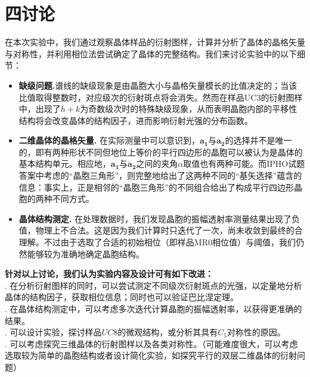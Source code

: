 \documentclass{ctexart}
\begin{document}
\section*{四\quad 讨论}

在本次实验中，我们通过观察晶体样品的衍射图样，计算并分析了晶体的晶格矢量与对称性，并利用相位法尝试确定了晶体的完整结构。我们来讨论实验中的以下细节：
\begin{itemize}
  \item \textbf{缺级问题.}\quad 谱线的缺级现象是由晶胞大小与晶格矢量模长的比值决定的；当该比值取得整数时，对应级次的衍射斑点将会消失。然而在样品UC3的衍射图样中，出现了$h+k$为奇数级次时的特殊缺级现象，从而表明晶胞内部的平移性结构将会改变晶体的结构因子，进而影响衍射光强的分布函数。
  \item \textbf{二维晶体的晶格矢量.} 在实际测量中可以意识到，$\bm{a_1}$与$\bm{a_2}$的选择并不是唯一的，即有两种形状不同但地位上等价的平行四边形的晶胞可以被认为是晶体的基本结构单元。相应地，$\bm{a_1}$与$\bm{a_2}$之间的夹角$\alpha$取值也有两种可能。而IPHO试题答案中考虑的“晶胞三角形”，则完整地给出了这两种不同的“基矢选择”蕴含的信息：事实上，正是相邻的“晶胞三角形”的不同组合给出了构成平行四边形晶胞的两种不同方式。
  \item \textbf{晶体结构测定.} 在处理数据时，我们发现晶胞的振幅透射率测量结果出现了负值，物理上不合法。这是因为我们计算时只迭代了一次，尚未收敛到最终的合理解。不过由于选取了合适的初始相位（即样品MR0相位值）与阈值，我们仍然能够较为准确地确定晶胞结构。
\end{itemize}
\textbf{针对以上讨论，我们认为实验内容及设计可有如下改进：}\\
. 在分析衍射图样的同时，可以尝试测定不同级次衍射斑点的光强，以定量地分析晶体的结构因子，获取相位信息；同时也可以验证巴比涅定理。\\
. 在晶体结构测定中，可以考虑多次迭代计算晶胞的振幅透射率，以获得更准确的结果。\\
. 可以设计实验，探讨样品$UC8$的微观结构，或分析其具有$C_5$对称性的原因。\\
. 可以考虑探究三维晶体的衍射图样以及各类对称性。（可能难度很大，可以考虑选取较为简单的晶胞结构或者设计简化实验，如探究平行的双层二维晶体的衍射问题）\\
\end{document}
